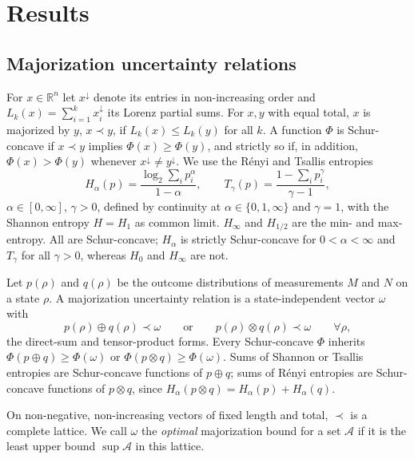 \documentclass[11pt]{article}
\theoremstyle{definition}
\newcommand{\maj}{\prec}
\begin{document}
\section*{Results}

\subsection*{Majorization uncertainty relations}

For $x\in\mathbb{R}^n$ let $x^\downarrow$ denote its entries in non-increasing
order and $L_k(x)=\sum_{i=1}^kx^\downarrow_i$ its Lorenz partial sums. For $x,y$
with equal total, $x$ is majorized by $y$, $x\maj y$, if $L_k(x)\le L_k(y)$ for
all $k$\cite{MarshallOlkin2011}. A function $\Phi$ is Schur-concave if $x\maj y$
implies $\Phi(x)\ge\Phi(y)$, and strictly so if, in addition, $\Phi(x)>\Phi(y)$
whenever $x^\downarrow\ne y^\downarrow$. We use the R\'enyi and Tsallis
entropies\cite{Renyi1961,Tsallis1988}
\begin{equation}
  H_\alpha(p)=\frac{\log_2\sum_ip_i^\alpha}{1-\alpha},\qquad
  T_\gamma(p)=\frac{1-\sum_ip_i^\gamma}{\gamma-1},
  \label{eq:entropies}
\end{equation}
$\alpha\in[0,\infty]$, $\gamma>0$, defined by continuity at $\alpha\in\{0,1,\infty\}$
and $\gamma=1$, with the Shannon entropy $H=H_1$ as common limit. $H_\infty$ and
$H_{1/2}$ are the min- and max-entropy\cite{KRS2009}. All are Schur-concave;
$H_\alpha$ is strictly Schur-concave for $0<\alpha<\infty$ and $T_\gamma$ for all
$\gamma>0$, whereas $H_0$ and $H_\infty$ are not.

Let $p(\rho)$ and $q(\rho)$ be the outcome distributions of measurements $M$ and
$N$ on a state $\rho$. A majorization uncertainty relation\cite{Partovi2011,FGG2013,PRZ2013,RPZ2014}
is a state-independent vector $\omega$ with
\begin{equation}
  p(\rho)\oplus q(\rho)\maj\omega\qquad\text{or}\qquad
  p(\rho)\otimes q(\rho)\maj\omega\qquad\forall\rho,
  \label{eq:MUR}
\end{equation}
the direct-sum and tensor-product forms. Every Schur-concave $\Phi$ inherits
$\Phi(p\oplus q)\ge\Phi(\omega)$ or $\Phi(p\otimes q)\ge\Phi(\omega)$. Sums of Shannon
or Tsallis entropies are Schur-concave functions of $p\oplus q$; sums of R\'enyi
entropies are Schur-concave functions of $p\otimes q$, since
$H_\alpha(p\otimes q)=H_\alpha(p)+H_\alpha(q)$.

On non-negative, non-increasing vectors of fixed length and total, $\maj$ is a
complete lattice\cite{CicaleseVaccaro2002,Bosyk2019}. We call $\omega$ the
\emph{optimal} majorization bound for a set $\mathcal A$ if it is the least upper
bound $\sup\mathcal A$ in this lattice.
\end{document}
